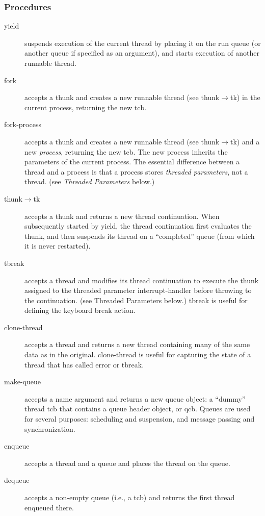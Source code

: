 \documentclass{article}
\begin{document}
\subsubsection{Procedures}
\begin{description}

\item[\sf yield] suspends execution of the current thread by placing it on
the run queue (or another queue if specified as an argument), and
starts execution of another runnable thread.

\item[\sf fork] accepts a thunk and creates a new runnable thread (see
{\sf thunk$\rightarrow$tk}) in the current process, returning the new
tcb.

\item[\sf fork-process] accepts a thunk and creates a new runnable
thread (see {\sf thunk$\rightarrow$tk}) and a new {\em process},
returning the new tcb.  The new process inherits the parameters
of the current process.  The essential difference between a thread and
a process is that a process stores {\em threaded parameters}, not a
thread.  (see {\em Threaded Parameters} below.)

\item[\sf thunk$\rightarrow$tk] accepts a thunk and returns a new
thread continuation.  When subsequently started by {\sf yield}, the
thread continuation first evaluates the thunk, and then suspends its
thread on a ``completed'' queue (from which it is never restarted).

\item[\sf tbreak] accepts a thread and modifies its thread
continuation to execute the thunk assigned to the threaded parameter
{\sf interrupt-handler} before throwing to the continuation.  (see
{\sf Threaded Parameters} below.) {\sf tbreak\/} is useful for
defining the keyboard break action.

\item[\sf clone-thread] accepts a thread and returns a new thread
containing many of the same data as in the original.  {\sf
clone-thread\/} is useful for capturing the state of a thread that has
called error or tbreak.

\item[\sf make-queue] accepts a name argument and returns a new queue
object: a ``dummy'' thread tcb that contains a queue header object, or
qcb.  Queues are used for several purposes: scheduling and suspension,
and message passing and synchronization.

\item[\sf enqueue] accepts a thread and a queue and places the thread
on the queue.

\item[\sf dequeue] accepts a non-empty queue (i.e., a tcb) and
returns the first thread enqueued there.

\end{description}
\end{document}
